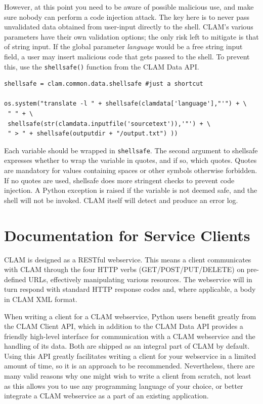 \documentclass[a4paper,12pt,twoside,openright]{report}
\begin{document}
However, at this point you need to be aware of possible malicious use, and make
sure nobody can perform a code injection attack. The key here is to never pass
unvalidated data obtained from user-input directly to the shell. CLAM's various
parameters have their own validation options; the only risk left to mitigate is
that of string input. If the global parameter \emph{language} would be a free
string input field, a user may insert malicious code that gets passed to the
shell. To prevent this, use the \texttt{shellsafe()} function from the CLAM
Data API. 


{ \small
\begin{verbatim}
shellsafe = clam.common.data.shellsafe #just a shortcut

os.system("translate -l " + shellsafe(clamdata['language'],"'") + \
 " " + \
 shellsafe(str(clamdata.inputfile('sourcetext')),'"') + \
 " > " + shellsafe(outputdir + "/output.txt") ))
\end{verbatim}
}

Each variable should be wrapped in \texttt{shellsafe}. The second argument to
shellsafe expresses whether to wrap the variable in quotes, and if so, which
quotes. Quotes are mandatory for values containing spaces or other symbols
otherwise forbidden. If no quotes are used, shellsafe does more stringent
checks to prevent code injection. A Python exception is raised if the variable
is not deemed safe, and the shell will not be invoked. CLAM itself will detect
and produce an error log.


\chapter{Documentation for Service Clients}

CLAM is designed as a RESTful webservice. This means a client communicates with
CLAM through the four HTTP verbs (GET/POST/PUT/DELETE) on pre-defined URLs,
effectively manipulating various resources. The webservice will in turn respond
with standard HTTP response codes and, where applicable, a body in CLAM XML format.

When writing a client for a CLAM webservice, Python users benefit greatly from
the CLAM Client API, which in addition to the CLAM Data API provides a friendly
high-level interface for communication with a CLAM webservice and the handling
of its data. Both are shipped as an integral part of CLAM by default. Using
this API greatly facilitates writing a client for your webservice in a limited
amount of time, so it is an approach to be recommended. Nevertheless, there are
many valid reasons why one might wish to write a client from scratch, not least as
this allows you to use any programming language of your choice, or better
integrate a CLAM webservice as a part of an existing application.
\end{document}
